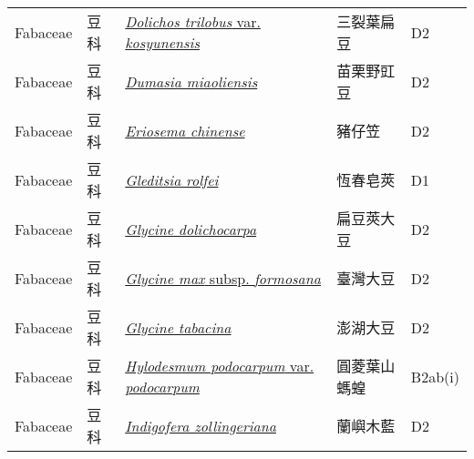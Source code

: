 {\begin{longtable}{p{2.5cm}p{2cm}p{5cm}p{2.5cm}p{3cm}}
    Fabaceae & 豆科 & \href{http://www.theplantlist.org/tpl1.1/search?q=Dolichos+trilobus+var.+kosyunensis}{\textit{Dolichos trilobus} var. \textit{kosyunensis} } & 三裂葉扁豆 & D2 \index{Dolichos@\textit{Dolichos}!trilobus@\textit{trilobus}!var. kosyunensis@var. \textit{kosyunensis}}  \index{三裂葉扁豆} \\
    Fabaceae & 豆科 & \href{http://www.theplantlist.org/tpl1.1/search?q=Dumasia+miaoliensis}{\textit{Dumasia miaoliensis} } & 苗栗野豇豆 & D2 \index{Dumasia@\textit{Dumasia}!miaoliensis@\textit{miaoliensis}}  \index{苗栗野豇豆} \\
    Fabaceae & 豆科 & \href{http://www.theplantlist.org/tpl1.1/search?q=Eriosema+chinense}{\textit{Eriosema chinense} } & 豬仔笠 & D2 \index{Eriosema@\textit{Eriosema}!chinense@\textit{chinense}}  \index{豬仔笠} \\
    Fabaceae & 豆科 & \href{http://www.theplantlist.org/tpl1.1/search?q=Gleditsia+rolfei}{\textit{Gleditsia rolfei} } & 恆春皂莢 & D1 \index{Gleditsia@\textit{Gleditsia}!rolfei@\textit{rolfei}}  \index{恆春皂莢} \\
    Fabaceae & 豆科 & \href{http://www.theplantlist.org/tpl1.1/search?q=Glycine+dolichocarpa}{\textit{Glycine dolichocarpa} } & 扁豆莢大豆 & D2 \index{Glycine@\textit{Glycine}!dolichocarpa@\textit{dolichocarpa}}  \index{扁豆莢大豆} \\
    Fabaceae & 豆科 & \href{http://www.theplantlist.org/tpl1.1/search?q=Glycine+max+subsp.+formosana}{\textit{Glycine max} subsp. \textit{formosana} } & 臺灣大豆 & D2 \index{Glycine@\textit{Glycine}!max@\textit{max}!subsp. formosana@subsp. \textit{formosana}}  \index{臺灣大豆} \\
    Fabaceae & 豆科 & \href{http://www.theplantlist.org/tpl1.1/search?q=Glycine+tabacina}{\textit{Glycine tabacina} } & 澎湖大豆 & D2 \index{Glycine@\textit{Glycine}!tabacina@\textit{tabacina}}  \index{澎湖大豆} \\
    Fabaceae & 豆科 & \href{http://www.theplantlist.org/tpl1.1/search?q=Hylodesmum+podocarpum+var.+podocarpum}{\textit{Hylodesmum podocarpum} var. \textit{podocarpum} } & 圓菱葉山螞蝗 & B2ab(i) \index{Hylodesmum@\textit{Hylodesmum}!podocarpum@\textit{podocarpum}!var. podocarpum@var. \textit{podocarpum}}  \index{圓菱葉山螞蝗} \\
    Fabaceae & 豆科 & \href{http://www.theplantlist.org/tpl1.1/search?q=Indigofera+zollingeriana}{\textit{Indigofera zollingeriana} } & 蘭嶼木藍 & D2 \index{Indigofera@\textit{Indigofera}!zollingeriana@\textit{zollingeriana}}  \index{蘭嶼木藍} \\

\end{longtable}}

